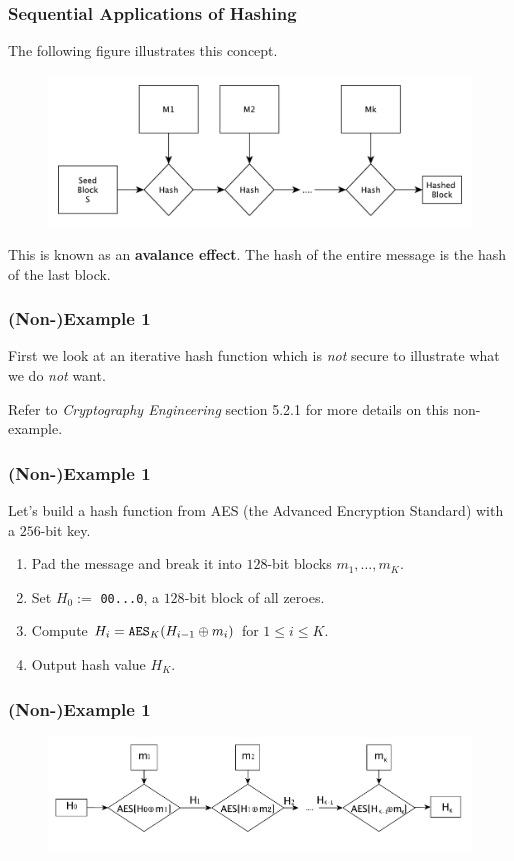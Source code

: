 \documentclass{beamer}
\newcommand{\<}{\langle}
\renewcommand{\>}{\rangle}
\begin{document}
\begin{frame}
\frametitle{Sequential Applications of Hashing}

The following figure illustrates this concept. 
\begin{figure}
\includegraphics[scale=.5]{IMG/hash3}
\end{figure}

This is known as an \textbf{avalance effect}. The hash of the entire message is the hash of the last block.
\end{frame}




\begin{frame}
\frametitle{(Non-)Example 1}

First we look at an iterative hash function which is \emph{not} secure to illustrate what we do \emph{not} want. \newline

Refer to \emph{Cryptography Engineering} section 5.2.1 for more details on this non-example. 
\end{frame}


\begin{frame}[fragile]
\frametitle{(Non-)Example 1}

Let's build a hash function from AES (the Advanced Encryption Standard) with a $256$-bit key. 
\begin{enumerate}
\item Pad the message and break it into $128$-bit blocks $m_1, \dots, m_K$. 
\item Set $H_0:=$ \verb|00...0|, a $128$-bit block of all zeroes. 
\item Compute $H_i = \verb|AES|_K(H_{i-1}\oplus m_i)$ for $1\le i \le K$.
\item Output hash value $H_K$.
\end{enumerate}
\end{frame}


\begin{frame}
\frametitle{(Non-)Example 1}

\begin{figure}
\includegraphics[scale=.4]{IMG/nonexample}
\end{figure}
\end{frame}
\end{document}
